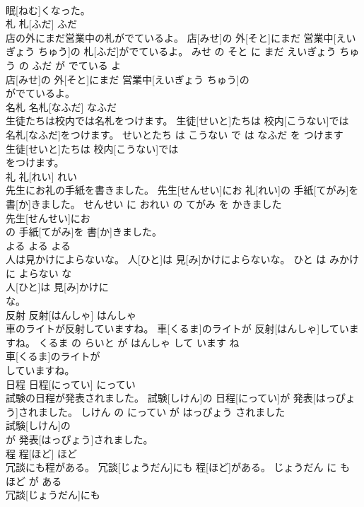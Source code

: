 \documentclass[8pt]{extreport}
\begin{document}
\begin{CJK}{UTF8}{min}
\\	眠[ねむ]くなった。			
\\	札	札[ふだ]	ふだ	
\\	店の外にまだ営業中の札がでているよ。	店[みせ]の 外[そと]にまだ 営業中[えいぎょう ちゅう]の 札[ふだ]がでているよ。	みせ の そと に まだ えいぎょう ちゅう の ふだ が でている よ	
\\	店[みせ]の 外[そと]にまだ 営業中[えいぎょう ちゅう]の
\\	がでているよ。			
\\	名札	名札[なふだ]	なふだ	
\\	生徒たちは校内では名札をつけます。	生徒[せいと]たちは 校内[こうない]では 名札[なふだ]をつけます。	せいとたち は こうない で は なふだ を つけます	
\\	生徒[せいと]たちは 校内[こうない]では
\\	をつけます。			
\\	礼	礼[れい]	れい	
\\	先生にお礼の手紙を書きました。	先生[せんせい]にお 礼[れい]の 手紙[てがみ]を 書[か]きました。	せんせい に おれい の てがみ を かきました	
\\	先生[せんせい]にお
\\	の 手紙[てがみ]を 書[か]きました。			
\\	よる	よる	よる	
\\	人は見かけによらないな。	人[ひと]は 見[み]かけによらないな。	ひと は みかけ に よらない な	
\\	人[ひと]は 見[み]かけに
\\	な。			
\\	反射	反射[はんしゃ]	はんしゃ	
\\	車のライトが反射していますね。	車[くるま]のライトが 反射[はんしゃ]していますね。	くるま の らいと が はんしゃ して います ね	
\\	車[くるま]のライトが
\\	していますね。			
\\	日程	日程[にってい]	にってい	
\\	試験の日程が発表されました。	試験[しけん]の 日程[にってい]が 発表[はっぴょう]されました。	しけん の にってい が はっぴょう されました	
\\	試験[しけん]の
\\	が 発表[はっぴょう]されました。			
\\	程	程[ほど]	ほど	
\\	冗談にも程がある。	冗談[じょうだん]にも 程[ほど]がある。	じょうだん に も ほど が ある	
\\	冗談[じょうだん]にも

\end{CJK}
\end{document}
